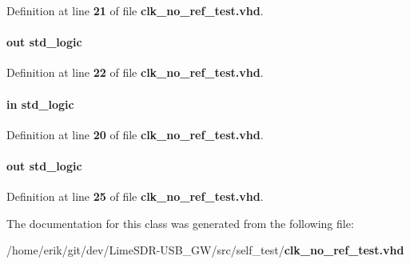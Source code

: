 Definition at line {\bf 21} of file {\bf clk\+\_\+no\+\_\+ref\+\_\+test.\+vhd}.

\paragraph[{test\+\_\+complete}]{ {\bfseries \textcolor{keywordflow}{out}\textcolor{vhdlchar}{ }} {\bfseries \textcolor{comment}{std\+\_\+logic}\textcolor{vhdlchar}{ }} \hspace{0.3cm}{\ttfamily [Port]}}\label{classclk__no__ref__test_acf1984f76c7a6676510f3d7774e724cd}


Definition at line {\bf 22} of file {\bf clk\+\_\+no\+\_\+ref\+\_\+test.\+vhd}.

\paragraph[{test\+\_\+en}]{ {\bfseries \textcolor{keywordflow}{in}\textcolor{vhdlchar}{ }} {\bfseries \textcolor{comment}{std\+\_\+logic}\textcolor{vhdlchar}{ }} \hspace{0.3cm}{\ttfamily [Port]}}\label{classclk__no__ref__test_a4b3cbe4c35cbc762687ca6f1f8d45f6f}


Definition at line {\bf 20} of file {\bf clk\+\_\+no\+\_\+ref\+\_\+test.\+vhd}.

\paragraph[{test\+\_\+pass\+\_\+fail}]{ {\bfseries \textcolor{keywordflow}{out}\textcolor{vhdlchar}{ }} {\bfseries \textcolor{comment}{std\+\_\+logic}\textcolor{vhdlchar}{ }} \hspace{0.3cm}{\ttfamily [Port]}}\label{classclk__no__ref__test_a1bba60b74f318713ff472903c86e248c}


Definition at line {\bf 25} of file {\bf clk\+\_\+no\+\_\+ref\+\_\+test.\+vhd}.



The documentation for this class was generated from the following file\+:\begin{DoxyCompactItemize}
\item 
/home/erik/git/dev/\+Lime\+S\+D\+R-\/\+U\+S\+B\+\_\+\+G\+W/src/self\+\_\+test/{\bf clk\+\_\+no\+\_\+ref\+\_\+test.\+vhd}\end{DoxyCompactItemize}
